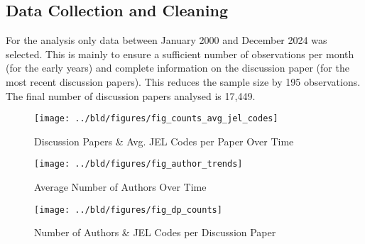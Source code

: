 \documentclass[11pt, a4paper, leqno]{article}
\begin{document}
\subsection{Data Collection and Cleaning}
For the analysis only data between January 2000 and December 2024 was selected.
This is mainly to ensure a sufficient number of observations per month (for the early years) and complete information on the discussion paper (for the most recent discussion papers).
This reduces the sample size by 195 observations. The final number of discussion papers analysed is 17,449.

\begin{figure}
    \centering
    \texttt{[image: ../bld/figures/fig\_counts\_avg\_jel\_codes]}
    \caption{Discussion Papers \& Avg. JEL Codes per Paper Over Time}
    \label{fig:monthly_counts_and_avg_jel_codes_per_paper}
\end{figure}

\begin{figure}
    \centering
    \texttt{[image: ../bld/figures/fig\_author\_trends]}
    \caption{Average Number of Authors Over Time}
    \label{fig:author_trends}
\end{figure}

\begin{figure}
    \centering
    \texttt{[image: ../bld/figures/fig\_dp\_counts]}
    \caption{Number of Authors \& JEL Codes per Discussion Paper}
    \label{fig:dp_counts}
\end{figure}

\clearpage
\end{document}

